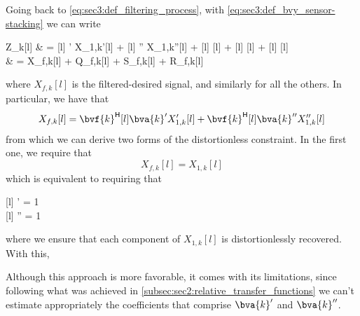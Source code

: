 Going back to \cref{eq:sec3:def_filtering_process}, with \cref{eq:sec3:def_bvy_sensor-stacking} we can write
\begin{equations}
	Z_{k}[l] 
	& =  ' X_{1,k}'[l] +  '' X_{1,k}''[l] +   +   +   \\
	& = X_{f,k}[l] + Q_{f,k}[l] + S_{f,k}[l] + R_{f,k}[l]
\end{equations}
where $X_{f,k}[l]$ is the filtered-desired signal, and similarly for all the others. In particular, we have that
\begin{equation}
	X_{f,k}[l] = \he{\bvf{k}}[l] \bva{k}' X_{1,k}'[l] + \he{\bvf{k}}[l] \bva{k}'' X_{1,k}''[l]
\end{equation}
from which we can derive two forms of the distortionless constraint. In the first one, we require that
\begin{equation}
	\label{eq:sec3:hard_distortionless_constriant}
	X_{f,k}[l] = X_{1,k}[l]
\end{equation}
which is equivalent to requiring that
\begin{subgather}
	\label{eq:sec3:hard_distortionless_constriant_separate}
	 ' = 1 \\
	 '' = 1
\end{subgather}
where we ensure that each component of $X_{1,k}[l]$ is distortionlessly recovered. With this, 

 Although this approach is more favorable, it comes with its limitations, since following what was achieved in \cref{subsec:sec2:relative_transfer_functions} we can't estimate appropriately the coefficients that comprise $\bva{k}'$ and $\bva{k}''$.

